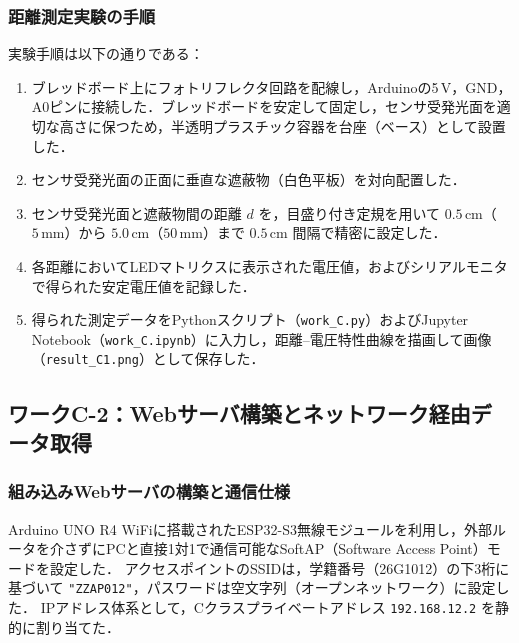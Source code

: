 \subsubsection{距離測定実験の手順}
実験手順は以下の通りである：
\begin{enumerate}
    \item ブレッドボード上にフォトリフレクタ回路を配線し，Arduinoの5\,V，GND，A0ピンに接続した．ブレッドボードを安定して固定し，センサ受発光面を適切な高さに保つため，半透明プラスチック容器を台座（ベース）として設置した．
    \item センサ受発光面の正面に垂直な遮蔽物（白色平板）を対向配置した．
    \item センサ受発光面と遮蔽物間の距離 $d$ を，目盛り付き定規を用いて $0.5\,\mathrm{cm}$（$5\,\mathrm{mm}$）から $5.0\,\mathrm{cm}$（$50\,\mathrm{mm}$）まで $0.5\,\mathrm{cm}$ 間隔で精密に設定した．
    \item 各距離においてLEDマトリクスに表示された電圧値，およびシリアルモニタで得られた安定電圧値を記録した．
    \item 得られた測定データをPythonスクリプト（\texttt{work\_C.py}）およびJupyter Notebook（\texttt{work\_C.ipynb}）に入力し，距離--電圧特性曲線を描画して画像（\texttt{result\_C1.png}）として保存した．
\end{enumerate}


\subsection{ワークC-2：Webサーバ構築とネットワーク経由データ取得}

\subsubsection{組み込みWebサーバの構築と通信仕様}
Arduino UNO R4 WiFiに搭載されたESP32-S3無線モジュールを利用し，外部ルータを介さずにPCと直接1対1で通信可能なSoftAP（Software Access Point）モードを設定した．
アクセスポイントのSSIDは，学籍番号（26G1012）の下3桁に基づいて \texttt{"ZZAP012"}，パスワードは空文字列（オープンネットワーク）に設定した．
IPアドレス体系として，Cクラスプライベートアドレス \texttt{192.168.12.2} を静的に割り当てた．

